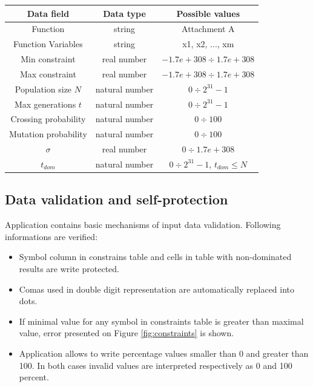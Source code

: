\documentclass[a4paper, 11pt]{article}
\begin{document}
	\begin{center}
	\begin{tabular}{| c | c | c |}
		\hline
		\textbf{Data field} & \textbf{Data type} & \textbf{Possible values}\\
		\hline
		Function & string & Attachment A\\ \hline
		Function Variables & string & x1, x2, ..., xm \\ \hline
		Min constraint & real number & $-1.7e+308 \div 1.7e+308$\\ \hline
		Max constraint & real number & $-1.7e+308 \div 1.7e+308$\\ \hline
		Population size $N$ & natural number & $0 \div 2^{31}-1$ \\ \hline
		Max generations $t$ & natural number & $0 \div 2^{31}-1$ \\ \hline
		Crossing probability & natural number & $0 \div 100$ \\ \hline
		Mutation probability & natural number & $0 \div 100$ \\ \hline
		$\sigma$ & real number & $0 \div 1.7e+308$ \\ \hline
		$t_{dom}$ & natural number & $0 \div 2^{31}-1$, $t_{dom} \leq N$ \\
		\hline
	\end{tabular}			
	\end{center}
	
	\subsection{Data validation and self-protection}
	Application contains basic mechanisms of input data validation. Following informations are verified:
	\begin{itemize}
		\item Symbol column in constrains table and cells in table with non-dominated results are write protected.
		\item Comas used in double digit representation are automatically replaced into dots.
		\item If minimal value for any symbol in constraints table is greater than maximal value, error presented on Figure \ref{fig:constraints} is shown.
		\item Application allows to write percentage values smaller than 0 and greater than 100. In both cases invalid values are interpreted respectively as 0 and 100 percent.
	\end{itemize}
\end{document}
